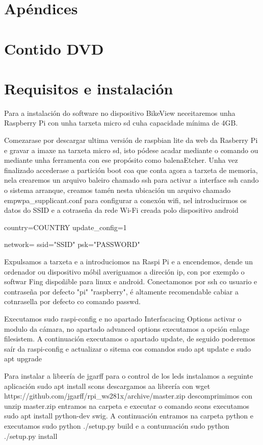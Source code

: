 \newpage
\chapter*{Apéndices}
\thispagestyle{empty}

\chapter{Contido DVD}

\chapter{Requisitos e instalación}
Para a instalación do software no dispositivo BikeView neceitaremos unha Raspberry Pi con unha tarxeta micro sd cuha capacidade mínima de 4GB.

Comezarase por descargar ultima versión de raspbian lite da web da Rasberry Pi e gravar a imaxe na tarxeta micro sd, isto pódese acadar mediante o comando  ou mediante unha ferramenta con ese propósito como balenaEtcher.
Unha vez finalizado accederase a partición boot coa que conta agora a tarxeta de memoria, nela crearemos un arquivo baleiro chamado ssh para activar a interface ssh cando o sistema arranque, creamos tamén nesta ubicación un arquivo chamado emp{wpa_supplicant.conf} para configurar a conexón wifi, nel introducirmos os datos do SSID e a cotraseña da rede Wi-Fi creada polo dispositivo android

	country=COUNTRY
	update_config=1

	network={
	       ssid="SSID"
	       psk="PASSWORD"
	    }

Expulsamos a tarxeta e a introduciomos na Raspi Pi e a encendemos, dende un ordenador ou dispositivo móbil averiguamos a direción ip, con por exemplo o softwar Fing dispoñible para linux e android. Conectamonos por ssh co usuario e contraseña por defecto "pi" "raspberry", é altamente recomendable cabiar a cotnrasella por defecto co comando passwd.

Executamos sudo raspi-config e no apartado Interfacacing Options activar o modulo da cámara, no apartado advanced options executamos a opción enlage filesistem. A continuación executamos o apartado update, de seguido poderemos saír da raspi-config e actualizar o sitema cos comandos
sudo apt update e sudo apt upgrade

Para instalar a librería  de jgarff para o control de los leds instalamos a seguinte aplicación sudo apt install scons
descargamos aa librería con wget https://github.com/jgarff/rpi_ws281x/archive/master.zip
descomprimimos con unzip master.zip
entramos na carpeta e executar o comando scons
executamos sudo apt install python-dev swig. A continuación entramos na carpeta python e executamos sudo python ./setup.py build e a contunuación sudo python ./setup.py install

\newpage
\thispagestyle{empty}

